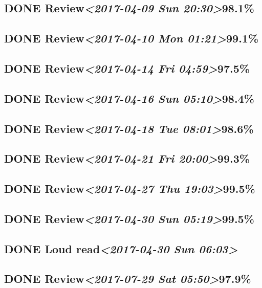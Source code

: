 \documentclass[11pt]{ctexart}
\begin{document}
\subsection{{\bfseries\sffamily DONE} Review\textit{<2017-04-09 Sun 20:30>}98.1\%}
\label{sec:orge1436a2}
\subsection{{\bfseries\sffamily DONE} Review\textit{<2017-04-10 Mon 01:21>}99.1\%}
\label{sec:orge775914}
\subsection{{\bfseries\sffamily DONE} Review\textit{<2017-04-14 Fri 04:59>}97.5\%}
\label{sec:org499cce7}
\subsection{{\bfseries\sffamily DONE} Review\textit{<2017-04-16 Sun 05:10>}98.4\%}
\label{sec:orgfc67fac}
\subsection{{\bfseries\sffamily DONE} Review\textit{<2017-04-18 Tue 08:01>}98.6\%}
\label{sec:org30c2e3d}
\subsection{{\bfseries\sffamily DONE} Review\textit{<2017-04-21 Fri 20:00>}99.3\%}
\label{sec:orgc6a079e}
\subsection{{\bfseries\sffamily DONE} Review\textit{<2017-04-27 Thu 19:03>}99.5\%}
\label{sec:orgbed7e5d}
\subsection{{\bfseries\sffamily DONE} Review\textit{<2017-04-30 Sun 05:19>}99.5\%}
\label{sec:orgf97d06d}
\subsection{{\bfseries\sffamily DONE} Loud read\textit{<2017-04-30 Sun 06:03>}}
\label{sec:orgb6ee189}

\subsection{{\bfseries\sffamily DONE} Review\textit{<2017-07-29 Sat 05:50>}97.9\%}
\label{sec:org3257de9}
\end{document}
